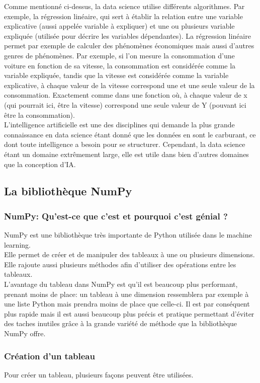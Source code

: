 \documentclass[a4paper, 12pt]{article}
\numberwithin{equation}{subsection}
\begin{document}
Comme mentionné ci-dessus, la data science utilise différents algorithmes. Par exemple, la régression linéaire, qui sert à établir la relation entre une variable explicative (aussi appelée variable à expliquer) et une ou plusieurs variable expliquée (utilisée pour décrire les variables dépendantes). La régression linéaire permet par exemple de calculer des phénomènes économiques mais aussi d'autres genres de phénomènes. Par exemple, si l'on mesure la consommation d'une voiture en fonction de sa vitesse, la consommation est considérée comme la variable expliquée, tandis que la vitesse est considérée comme la variable explicative, à chaque valeur de la vitesse correspond une et une seule valeur de la consommation. Exactement comme dans une fonction où, à chaque valeur de x (qui pourrait ici, être la vitesse) correspond une seule valeur de Y (pouvant ici être la consommation).\\

L'intelligence artificielle est une des disciplines qui demande la plus grande connaissance en data science étant donné que les données en sont le carburant, ce dont toute intelligence a besoin pour se structurer. Cependant, la data science étant un domaine extrêmement large, elle est utile dans bien d'autres domaines que la conception d'IA.
\subsection{La bibliothèque NumPy}
\subsubsection{NumPy: Qu'est-ce que c'est et pourquoi c'est génial ?}
NumPy est une bibliothèque très importante de Python utilisée dans le machine learning. \\

Elle permet de créer et de manipuler des tableaux à une ou plusieurs dimensions. Elle rajoute aussi plusieurs méthodes afin d'utiliser des opérations entre les tableaux. \\

L'avantage du tableau dans NumPy est qu’il est beaucoup plus performant, prenant moins de place: un tableau à une dimension ressemblera par exemple à une liste Python mais prendra moins de place que celle-ci. Il est par conséquent plus rapide mais il est aussi beaucoup plus précis et pratique permettant d’éviter des taches inutiles grâce à la grande variété de méthode que la bibliothèque NumPy offre.
\subsubsection{Création d'un tableau}
Pour créer un tableau, plusieurs façons peuvent être utilisées. \\
\end{document}
